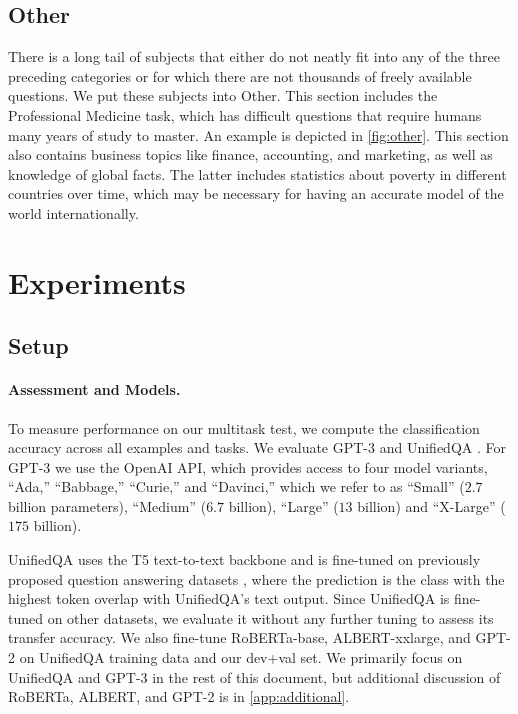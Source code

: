 \subsection{Other}
There is a long tail of subjects that either do not neatly fit into any of the three preceding categories or for which there are not thousands of freely available questions. We put these subjects into Other. This section includes the Professional Medicine task, which has difficult questions that require humans many years of study to master. An example is depicted in \ref{fig:other}.
This section also contains business topics like finance, accounting, and marketing, as well as knowledge of global facts. The latter includes statistics about poverty in different countries over time, which may be necessary for having an accurate model of the world internationally.

\section{Experiments}

\subsection{Setup}

\paragraph{Assessment and Models.} To measure performance on our multitask test, we compute the classification accuracy across all examples and tasks. We evaluate GPT-3 \citep{brown2020gpt3} and UnifiedQA \citep{khashabi2020unifiedqa}. For GPT-3 we use the OpenAI API, which provides access to four model variants,  ``Ada,'' ``Babbage,'' ``Curie,'' and ``Davinci,'' which we refer to as ``Small'' ($2.7$ billion parameters), ``Medium'' ($6.7$ billion), ``Large'' ($13$ billion) and ``X-Large'' ($175$ billion). 

UnifiedQA uses the T5 \citep{raffel2019exploringT5} text-to-text backbone and is fine-tuned on previously proposed question answering datasets \citep{lai2017race}, where the prediction is the class with the highest token overlap with UnifiedQA's text output. Since UnifiedQA is fine-tuned on other datasets, we evaluate it without any further tuning to assess its transfer accuracy. We also fine-tune RoBERTa-base, ALBERT-xxlarge, and GPT-2 on UnifiedQA training data and our dev+val set. We primarily focus on UnifiedQA and GPT-3 in the rest of this document, but additional discussion of RoBERTa, ALBERT, and GPT-2 is in \ref{app:additional}.

